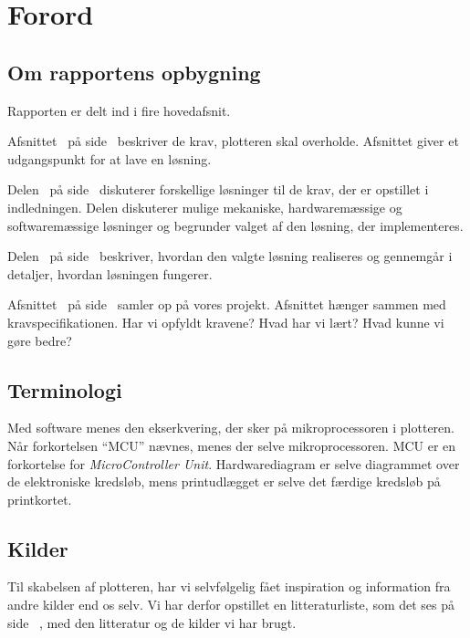 \chapter{Forord}


\section{Om rapportens opbygning}

Rapporten er delt ind i fire hovedafsnit.

Afsnittet~ på side~\pageref{ch:indledning}
beskriver de krav, plotteren skal overholde. Afsnittet giver et
udgangspunkt for at lave en løsning.

Delen~ på side~\pageref{prt:design} diskuterer
forskellige løsninger til de krav, der er opstillet i
indledningen. Delen diskuterer mulige mekaniske, hardwaremæssige og
softwaremæssige løsninger og begrunder valget af den løsning, der
implementeres.

Delen~ på
side~\pageref{prt:implementering} beskriver, hvordan den valgte
løsning realiseres og gennemgår i detaljer, hvordan løsningen
fungerer.

Afsnittet~ på side~\pageref{ch:afslutning} samler op på vores projekt.
Afsnittet hænger sammen med kravspecifikationen. Har vi opfyldt kravene? Hvad har vi lært?
Hvad kunne vi gøre bedre?

\section{Terminologi}


Med software menes den ekserkvering, der sker på mikroprocessoren i
plotteren. Når forkortelsen \enquote{MCU} nævnes, menes der selve
mikroprocessoren. MCU er en forkortelse for \textit{MicroController
  Unit}. Hardwarediagram er selve diagrammet over de elektroniske
kredsløb, mens printudlægget er selve det færdige kredsløb på
printkortet.

\section{Kilder}
Til skabelsen af plotteren, har vi selvfølgelig fået inspiration og
information fra andre kilder end os selv. Vi har derfor opstillet en
litteraturliste, som det ses på side ~\pageref{ch:litteratur}, med den
litteratur og de kilder vi har brugt.

